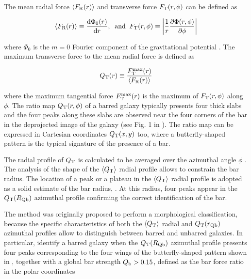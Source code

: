 \documentclass{aa}
\begin{document}
The mean radial force $\langle F_{\rm R} (r)\rangle$  and transverse force $F_{\rm T} (r, \phi)$ can be defined as

\begin{equation}
\langle F_{\rm R} (r)\rangle \equiv \frac{{\rm d}\Phi_0(r)}{{\rm d}r} ,\;\;{\rm and}\;\; F_{\rm T} (r, \phi)\equiv \left \lvert\frac{1}{r}\frac{\partial \Phi(r,\phi)}{\partial \phi}\right \rvert
\end{equation}

\noindent where $\Phi_0$ is the $m = 0$ Fourier component of the gravitational potential \citep{Buta2001}. The maximum transverse force to the mean radial force is defined as

\begin{equation}
Q_{\rm T}(r) \equiv \frac{F_{\rm T}^{\rm max}(r)}{\langle F_{\rm R} (r)\rangle}
\end{equation}

\noindent where the maximum tangential force $F_{\rm T}^{\rm max}(r)$ is the maximum of $F_{\rm T} (r, \phi)$ along $\phi$. The ratio map $Q_{\rm T}(r,\phi)$ of a barred galaxy typically presents four thick slabs and the four peaks along these slabs are observed near the four corners of the bar in the deprojected image of the galaxy (see Fig. 1 in \citealt{Lee2020}). The ratio map can be expressed in Cartesian coordinates $Q_{\rm T}(x,y)$ too, where a butterfly-shaped pattern is the typical signature of the presence of a bar. 

The radial profile of $Q_{\rm T}$ is calculated to be averaged over the azimuthal angle $\phi$ \citep{Buta2001}. The analysis of the shape of the $\langle Q_{\rm T}\rangle$ radial profile allows to constrain the bar radius. The location of a peak or a plateau in the $\langle Q_{\rm T}\rangle$ radial profile is adopted as a solid estimate of the bar radius, \rqb. At this radius, four peaks appear in the $Q_{\rm T}(R_{\rm Qb})$ azimuthal profile confirming the correct identification of the bar. 

The method was originally proposed to perform a morphological classification, because the specific characteristics of both the $\langle Q_{\rm T}\rangle$ radial and $Q_{\rm T}(r_{\rm Qb})$ azimuthal profiles allow to distinguish between barred and unbarred galaxies. In particular, \citet{Lee2020} identify a barred galaxy when the $Q_{\rm T}(R_{\rm Qb})$ azimuthal profile presents four peaks corresponding to the four wings of the butterfly-shaped pattern shown in \citet{Buta2001}, together with a global bar strength $Q_{\rm b}>0.15$, defined as the bar force ratio in the polar coordinates
\end{document}
